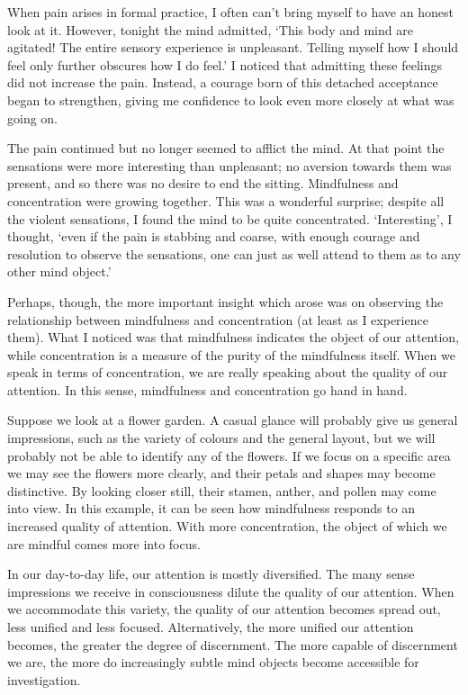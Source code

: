 When pain arises in formal practice, I often can't bring myself to have
an honest look at it. However, tonight the mind admitted, `This body and
mind are agitated! The entire sensory experience is unpleasant. Telling
myself how I should feel only further obscures how I do feel.' I noticed
that admitting these feelings did not increase the pain. Instead, a
courage born of this detached acceptance began to strengthen, giving me
confidence to look even more closely at what
was going on.

The pain continued but no longer seemed to afflict the
mind. At that point the sensations were more interesting than
unpleasant; no aversion towards them was present, and so there was no
desire to end the sitting. Mindfulness and concentration were growing
together. This was a wonderful surprise; despite all the violent
sensations, I found the mind to be quite concentrated. `Interesting', I
thought, `even if the pain is stabbing and coarse, with enough courage
and resolution to observe the sensations, one can just as well attend to
them as to any other mind object.'

Perhaps, though, the more important insight which arose was on observing
the relationship between mindfulness and concentration (at least as I
experience them). What I noticed was that mindfulness indicates the
object of our attention, while concentration is a measure of the purity
of the mindfulness itself. When we speak in terms of concentration, we
are really speaking about the quality of our attention. In this sense, 
mindfulness and concentration go hand in hand. 

Suppose we look at a flower garden. A casual glance will probably give
us general impressions, 
such as the variety of colours and the general layout, but we will
probably not be able to identify any of the flowers. If we focus on a
specific area we may see the flowers more clearly, and their petals and
shapes may become distinctive. By looking closer still, their stamen, 
anther, and pollen may come into view. In this example, it can be seen
how mindfulness responds to an increased quality of attention. With more
concentration, the object of which we are mindful comes more into focus. 

In our day-to-day life, our attention is mostly diversified. The many
sense impressions we receive in consciousness dilute the quality of our
attention. When we accommodate this variety, the quality of our
attention becomes spread out, less unified and less focused. 
Alternatively, the more unified our attention becomes, the greater the
degree of discernment. The more capable of discernment we are, the more
do increasingly subtle mind objects become accessible for investigation. 

